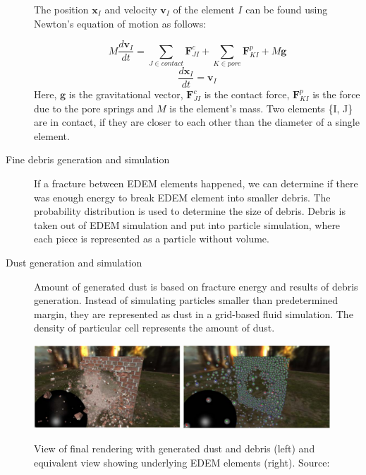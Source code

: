 \begin{description}
The position $\mathbf{x}_I$ and velocity $\mathbf{v}_I$ of the element $\mathit{I}$ can be found using Newton’s equation of motion as follows:
 
\[M\frac{d\mathbf{v}_I}{dt} = \sum_{J \in contact}^{} \mathbf{F}_{JI}^c + \sum_{K \in pore}^{} \mathbf{F}_{KI}^p + M\mathbf{g} \]
\[ \frac{d\mathbf{x}_I}{dt} = \mathbf{v}_I \]
Here, $\mathbf{g}$ is the gravitational vector, $\mathbf{F}^c_{JI}$ is the contact force, $\mathbf{F}^p_{KI}$ is the force due to the pore springs and $\mathit{M}$ is the element’s mass. Two elements \{I, J\} are in contact, if they are closer to each other than the diameter of a single element.

\item[Fine debris generation and simulation] If a fracture between EDEM elements happened, we can determine if there was enough energy to break EDEM element into smaller debris. The probability distribution is used to determine the size of debris. Debris is taken out of EDEM simulation and put into particle simulation, where each piece is represented as a particle without volume.

\item[Dust generation and simulation] Amount of generated dust is based on fracture energy and results of debris generation. Instead of simulating particles smaller than predetermined margin, they are represented as dust in a grid-based fluid simulation. The density of particular cell represents the amount of dust.

\end{description}

 \begin{figure}
        \centering
        \includegraphics[width=0.49\textwidth]{img/edem_real}
        \includegraphics[width=0.49\textwidth]{img/edem}
        \caption{View of final rendering with generated dust and debris (left) and equivalent view showing underlying EDEM elements (right). Source: \citet{edem}}
        \label{fig:edem}
    \end{figure}
   
